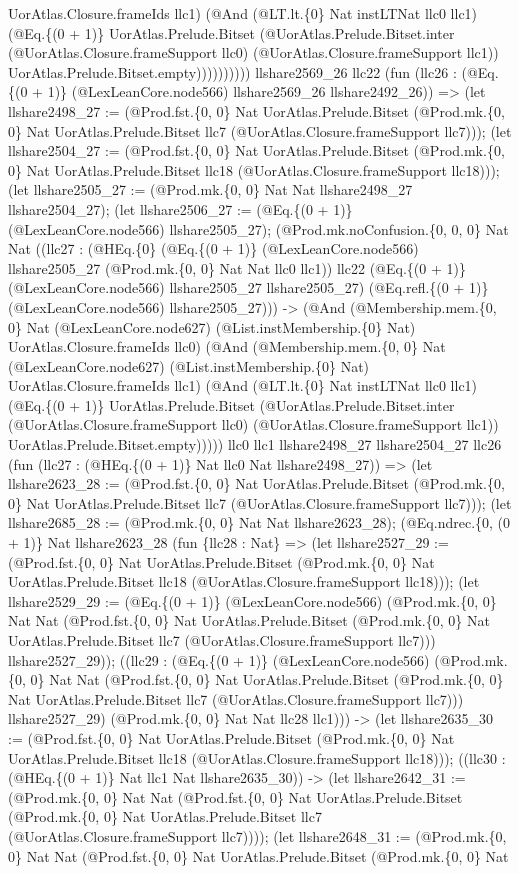 \documentclass[11pt]{article}
\begin{document}
UorAtlas.Closure.frameIds llc1) (@And (@LT.lt.\{0\} Nat instLTNat llc0 llc1) (@Eq.\{(0 + 1)\} UorAtlas.Prelude.Bitset (@UorAtlas.Prelude.Bitset.inter (@UorAtlas.Closure.frameSupport llc0) (@UorAtlas.Closure.frameSupport llc1)) UorAtlas.Prelude.Bitset.empty)))))))))) llshare2569\_26 llc22 (fun (llc26 : (@Eq.\{(0 + 1)\} (@LexLeanCore.node566) llshare2569\_26 llshare2492\_26)) => (let llshare2498\_27 := (@Prod.fst.\{0, 0\} Nat UorAtlas.Prelude.Bitset (@Prod.mk.\{0, 0\} Nat UorAtlas.Prelude.Bitset llc7 (@UorAtlas.Closure.frameSupport llc7))); (let llshare2504\_27 := (@Prod.fst.\{0, 0\} Nat UorAtlas.Prelude.Bitset (@Prod.mk.\{0, 0\} Nat UorAtlas.Prelude.Bitset llc18 (@UorAtlas.Closure.frameSupport llc18))); (let llshare2505\_27 := (@Prod.mk.\{0, 0\} Nat Nat llshare2498\_27 llshare2504\_27); (let llshare2506\_27 := (@Eq.\{(0 + 1)\} (@LexLeanCore.node566) llshare2505\_27); (@Prod.mk.noConfusion.\{0, 0, 0\} Nat Nat ((llc27 : (@HEq.\{0\} (@Eq.\{(0 + 1)\} (@LexLeanCore.node566) llshare2505\_27 (@Prod.mk.\{0, 0\} Nat Nat llc0 llc1)) llc22 (@Eq.\{(0 + 1)\} (@LexLeanCore.node566) llshare2505\_27 llshare2505\_27) (@Eq.refl.\{(0 + 1)\} (@LexLeanCore.node566) llshare2505\_27))) -> (@And (@Membership.mem.\{0, 0\} Nat (@LexLeanCore.node627) (@List.instMembership.\{0\} Nat) UorAtlas.Closure.frameIds llc0) (@And (@Membership.mem.\{0, 0\} Nat (@LexLeanCore.node627) (@List.instMembership.\{0\} Nat) UorAtlas.Closure.frameIds llc1) (@And (@LT.lt.\{0\} Nat instLTNat llc0 llc1) (@Eq.\{(0 + 1)\} UorAtlas.Prelude.Bitset (@UorAtlas.Prelude.Bitset.inter (@UorAtlas.Closure.frameSupport llc0) (@UorAtlas.Closure.frameSupport llc1)) UorAtlas.Prelude.Bitset.empty))))) llc0 llc1 llshare2498\_27 llshare2504\_27 llc26 (fun (llc27 : (@HEq.\{(0 + 1)\} Nat llc0 Nat llshare2498\_27)) => (let llshare2623\_28 := (@Prod.fst.\{0, 0\} Nat UorAtlas.Prelude.Bitset (@Prod.mk.\{0, 0\} Nat UorAtlas.Prelude.Bitset llc7 (@UorAtlas.Closure.frameSupport llc7))); (let llshare2685\_28 := (@Prod.mk.\{0, 0\} Nat Nat llshare2623\_28); (@Eq.ndrec.\{0, (0 + 1)\} Nat llshare2623\_28 (fun \{llc28 : Nat\} => (let llshare2527\_29 := (@Prod.fst.\{0, 0\} Nat UorAtlas.Prelude.Bitset (@Prod.mk.\{0, 0\} Nat UorAtlas.Prelude.Bitset llc18 (@UorAtlas.Closure.frameSupport llc18))); (let llshare2529\_29 := (@Eq.\{(0 + 1)\} (@LexLeanCore.node566) (@Prod.mk.\{0, 0\} Nat Nat (@Prod.fst.\{0, 0\} Nat UorAtlas.Prelude.Bitset (@Prod.mk.\{0, 0\} Nat UorAtlas.Prelude.Bitset llc7 (@UorAtlas.Closure.frameSupport llc7))) llshare2527\_29)); ((llc29 : (@Eq.\{(0 + 1)\} (@LexLeanCore.node566) (@Prod.mk.\{0, 0\} Nat Nat (@Prod.fst.\{0, 0\} Nat UorAtlas.Prelude.Bitset (@Prod.mk.\{0, 0\} Nat UorAtlas.Prelude.Bitset llc7 (@UorAtlas.Closure.frameSupport llc7))) llshare2527\_29) (@Prod.mk.\{0, 0\} Nat Nat llc28 llc1))) -> (let llshare2635\_30 := (@Prod.fst.\{0, 0\} Nat UorAtlas.Prelude.Bitset (@Prod.mk.\{0, 0\} Nat UorAtlas.Prelude.Bitset llc18 (@UorAtlas.Closure.frameSupport llc18))); ((llc30 : (@HEq.\{(0 + 1)\} Nat llc1 Nat llshare2635\_30)) -> (let llshare2642\_31 := (@Prod.mk.\{0, 0\} Nat Nat (@Prod.fst.\{0, 0\} Nat UorAtlas.Prelude.Bitset (@Prod.mk.\{0, 0\} Nat UorAtlas.Prelude.Bitset llc7 (@UorAtlas.Closure.frameSupport llc7)))); (let llshare2648\_31 := (@Prod.mk.\{0, 0\} Nat Nat (@Prod.fst.\{0, 0\} Nat UorAtlas.Prelude.Bitset (@Prod.mk.\{0, 0\} Nat 
\end{document}
